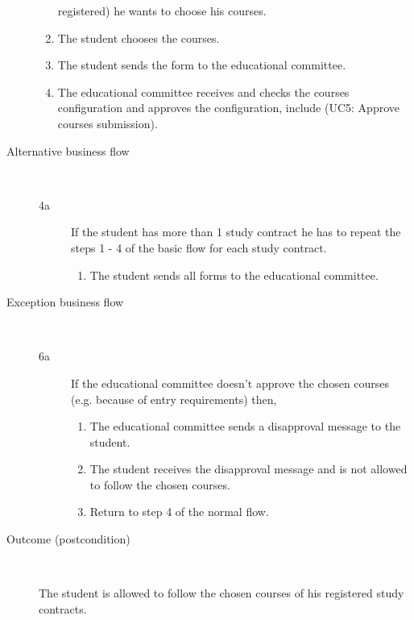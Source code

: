 \begin{description}
\begin{enumerate}
	  	registered) he wants to choose his courses.
	  	\item The student chooses the courses.
	  	\item The student sends the form to the educational committee.
	  	\item The educational committee receives and checks the courses
	  	configuration and approves the configuration, include (UC5: Approve
	  	courses submission).
	\end{enumerate}
	\item[Alternative business flow] \
	\begin{description}
		\item[4a]If the student has more than 1 study contract he has to
		repeat the steps 1 - 4 of the basic flow for each study contract.
			\begin{enumerate} 
	  			\item The student sends all forms to the educational committee.
			\end{enumerate}
	\end{description}
	\item[Exception business flow] \ 
	\begin{description}
		\item[6a] If the educational committee doesn't approve
		the chosen courses (e.g. because of entry requirements) then,
		\begin{enumerate}
		 	\item The educational committee sends a disapproval message to the student.
		 	\item The student receives the disapproval message and is not allowed to
		 	follow the chosen courses.
		 	\item Return to step 4 of the normal flow.
		\end{enumerate}
	\end{description}
	\item[Outcome (postcondition)] \  
		\par The student is allowed to follow the chosen courses of his registered
		study contracts.
\end{description}
